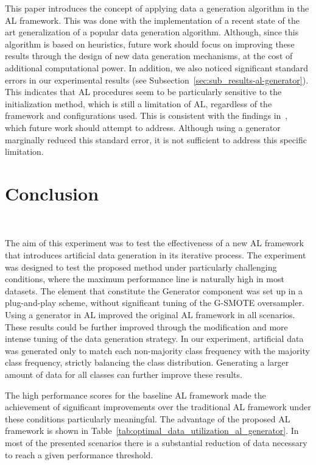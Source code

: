 This paper introduces the concept of applying data a generation algorithm in
the AL framework. This was done with the implementation of a recent state of
the art generalization of a popular data generation algorithm. Although, since
this algorithm is based on heuristics, future work should focus on improving
these results through the design of new data generation mechanisms, at the
cost of additional computational power. In addition, we also noticed
significant standard errors in our experimental results
(see Subsection~\ref{sec:sub_results-al-generator}). This indicates that
AL procedures seem to be particularly sensitive to the initialization method,
which is still a limitation of AL, regardless of the framework and
configurations used. This is consistent with the findings
in~\cite{Kottke2017}, which future work should attempt to address. Although
using a generator marginally reduced this standard error, it is not sufficient
to address this specific limitation.

\section{Conclusion}~\label{sec:conclusion-al-generator}

The aim of this experiment was to test the effectiveness of a new AL framework
that introduces artificial data generation in its iterative process. The
experiment was designed to test the proposed method under particularly
challenging conditions, where the maximum performance line is naturally high
in most datasets. The element that constitute the Generator component was set
up in a plug-and-play scheme, without significant tuning of the G-SMOTE
oversampler. Using a generator in AL improved the original AL framework in all
scenarios. These results could be further improved through the modification
and more intense tuning of the data generation strategy. In our experiment,
artificial data was generated only to match each non-majority class frequency
with the majority class frequency, strictly balancing the class distribution.
Generating a larger amount of data for all classes can further improve these
results. 

The high performance scores for the baseline AL framework made the achievement
of significant improvements over the traditional AL framework under these
conditions particularly meaningful. The advantage of the proposed AL framework
is shown in Table~\ref{tab:optimal_data_utilization_al_generator}. In most of the presented
scenarios there is a substantial reduction of data necessary to reach a given
performance threshold. 

